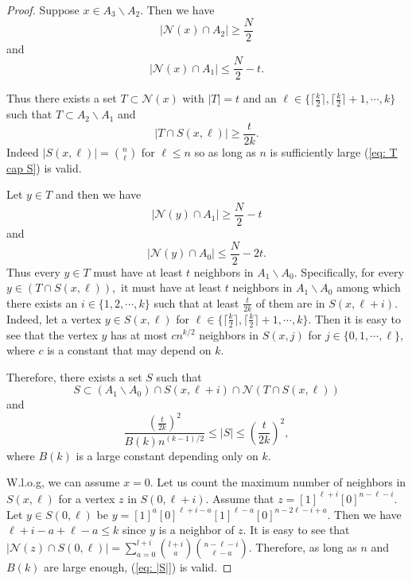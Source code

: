 \documentclass[reqno,11pt]{amsart}
\renewcommand{\leq}{\leqslant}
\renewcommand{\geq}{\geqslant}
\begin{document}
\begin{proof}
  Suppose $x \in A_3 \backslash A_2$. Then we have 
$$|\mathcal{N}(x) \cap A_2| \geq \frac{N}{2}$$ and 
$$|\mathcal{N}(x) \cap A_1| \leq \frac{N}{2}-t.$$
  
Thus there exists a set $T \subset \mathcal{N}(x)$ with $|T|=t$ and an $\ell \in \{ \lceil \frac{k}{2} \rceil,\lceil\frac{k}{2} \rceil+1,\cdots,k \}$ such that $T \subset A_2 \backslash A_1$ and 
\begin{equation} \label{eq: T cap S}
|T \cap S(x,\ell)| \geq \frac{t}{2k}.
\end{equation}
Indeed $|S(x,\ell)|=\binom{n}{\ell}$ for $\ell \leq n$ so as long as $n$ is sufficiently large (\ref{eq: T cap S}) is valid. 

Let $y \in T$ and then we have 
$$|\mathcal{N}(y) \cap A_1| \geq \frac{N}{2}-t$$ and 
$$|\mathcal{N}(y) \cap A_0| \leq \frac{N}{2}-2t.$$
Thus every $y \in T$ must have at least $t$ neighbors in $A_1 \backslash A_0$. Specifically, for every $y \in (T \cap S(x,\ell)),$ it must have at least $t$ neighbors in $A_1 \backslash A_0$ among which there exists an $i \in \{1,2,\cdots,k \}$ such that at least $\frac{t}{2k}$ of them are in $S(x,\ell+i)$. Indeed, let a vertex $y \in S(x,\ell)$
for $\ell \in \{ \lceil \frac{k}{2} \rceil,\lceil\frac{k}{2} \rceil+1,\cdots,k \}$. Then it is easy to see that the vertex $y$ has at most $cn^{k/2}$ neighbors in $S(x,j)$ for $j \in \{0,1,\cdots,\ell \}$, where $c$ is a constant that may depend on $k$. 

Therefore, there exists a set $S$ such that 
$$S \subset (A_1 \backslash A_0) \cap S(x,\ell+i) \cap \mathcal{N}(T \cap S(x,\ell))$$
and 
\begin{equation} \label{eq: |S|}
 \frac{(\frac{t}{2k})^2}{B(k)n^{(k-1)/2}}\leq |S| \leq \left(\frac{t}{2k} \right)^2,
 \end{equation}
where $B(k)$ is a large constant depending only on $k$. 

W.l.o.g, we can assume $x=0$. Let us count the maximum number of neighbors in $S(x,\ell)$ for a vertex $z$ in $S(0,\ell +i)$. Assume that $z=[1]^{\ell+i}[0]^{n-\ell-i}$. Let $y \in S(0,\ell)$ be  $y=[1]^a[0]^{\ell+i-a}[1]^{\ell-a}[0]^{n-2\ell-i+a}$. Then we have $\ell+i-a+\ell-a \leq k$ since $y$ is a neighbor of $z$. It is easy to see that $|\mathcal{N}(z) \cap S(0,\ell)|= \sum_{a=0}^{l+i} \binom{l+i}{a} \binom{n-\ell-i}{\ell-a}$. Therefore, as long as $n$ and $B(k)$ are large enough, (\ref{eq: |S|}) is valid. 


\end{proof}
\end{document}

